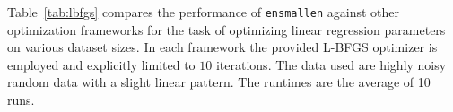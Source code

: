 \documentclass[twoside,11pt]{article}
\begin{document}


Table~\ref{tab:lbfgs} compares the performance
of {\tt ensmallen} against other optimization frameworks
for the task of optimizing linear regression parameters on various dataset sizes.
In each framework the provided L-BFGS optimizer is employed
and explicitly limited to $10$ iterations.
The data used are highly noisy random data with a slight linear pattern.
The runtimes are the average of 10 runs.





\end{document}
